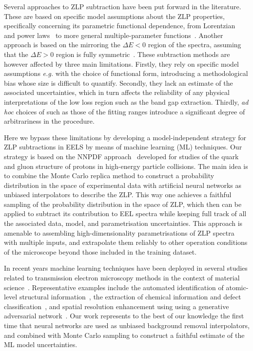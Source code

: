 Several approaches to ZLP subtraction have been put forward in the literature.
%
These are based on specific model assumptions about the ZLP properties, specifically
concerning its parametric functional dependence, from Lorentzian~\cite{Dorneich:1998}
and power laws~\cite{Erni:2005} to more general multiple-parameter functions~\cite{Benthem:2001}.
%
Another approach is based on the mirroring the $\Delta E <0$ region of the spectra, assuming
that the $\Delta E>0$ region is fully symmetric~\cite{Lazar:2003}.
%
These  subtraction methods are however affected by three main limitations.
%
Firstly, they rely on specific model assumptions {\it e.g.} with
the choice of functional form, introducing a methodological
bias whose size is difficult to quantify.
%
Secondly, they lack an estimate of the associated uncertainties, which in turn affects
the reliability of any physical interpretations of the low loss region such as the band gap extraction.
%
Thirdly, {\it ad hoc} choices of such as those of the fitting ranges introduce a significant degree of
arbitrariness in the procedure.

Here we bypass these limitations by developing a model-independent strategy
for ZLP subtractions in EELS by means of machine learning (ML) techniques.
%
Our strategy is based on the NNPDF approach~\cite{Ball:2008by,Ball:2012cx,Ball:2014uwa,Ball:2017nwa}
developed for studies
of the quark and gluon structure of protons in high-energy particle collisions.
%
The main idea is to combine the  Monte Carlo replica  method to construct a probability
distribution in the space of experimental data with artificial
neural networks as unbiased interpolators to describe the ZLP.
%
This way one achieves
a faithful sampling of the probability distribution in the space of ZLP,
which then can be applied to subtract its contribution to EEL spectra while keeping
full track of all the associated
data, model, and parametrisation uncertainties.
%
This approach is amenable to assembling high-dimensionality parametrisations
of ZLP spectra with multiple inputs, and extrapolate them reliably
to other operation conditions of the microscope beyond those included
in the training dataset.

In recent years
machine learning techniques have been deployed in several studies
related to transmission electron microscopy methods
in the context of material science~\cite{Gordon:2020, Zhang:2019, Jany:2017, Ziatdinov:2017}.
%
Representative examples
include the automated identification
of atomic-level structural information~\cite{10.1145/2834892.2834896},
the extraction of chemical information
and defect classification~\cite{doi:10.1021/acsnano.7b07504},
and spatial resolution enhancement
using  using a generative adversarial network~\cite{cite-key}.
%
Our work represents to the best of our knowledge
the first time that neural networks are used as 
 unbiased
background removal interpolators, and combined with Monte Carlo sampling to construct a faithful estimate
of the ML model uncertainties.

